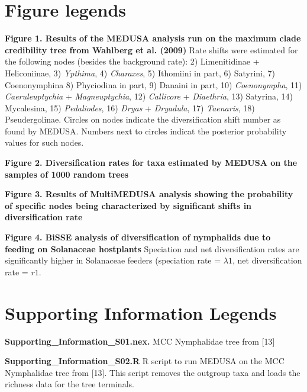 \documentclass[10pt]{article}
\begin{document}
\section*{Figure legends}
\begin{description}
 \item {\bf Figure 1. Results of the MEDUSA analysis run on the maximum
clade credibility tree from Wahlberg et al. (2009)} Rate shifts were estimated for the
following nodes (besides the background rate): 2) Limenitidinae +
Heliconiinae, 3) \emph{Ypthima}, 4) \emph{Charaxes}, 5) Ithomiini in
part, 6) Satyrini, 7) Coenonymphina 8) Phyciodina in part, 9) Danaini in
part, 10) \emph{Coenonympha}, 11) \emph{Caeruleuptychia} +
\emph{Magneuptychia}, 12) \emph{Callicore} + \emph{Diaethria}, 13)
Satyrina, 14) Mycalesina, 15) \emph{Pedaliodes}, 16) \emph{Dryas} +
\emph{Dryadula}, 17) \emph{Taenaris}, 18) Pseudergolinae. Circles on
nodes indicate the diversification shift number as found by MEDUSA.
Numbers next to circles indicat the posterior probability values for
such nodes.

\item {\bf Figure 2. Diversification rates for taxa estimated by MEDUSA on
the samples of 1000 random trees}

\item {\bf Figure 3. Results of MultiMEDUSA analysis showing the
probability of specific nodes being characterized by significant shifts
in diversification rate}

\item {\bf Figure 4. BiSSE analysis of diversification of nymphalids due
to feeding on Solanaceae hostplants} Speciation and net diversification
rates are significantly higher in Solanaceae feeders (speciation rate =
$\lambda1$, net diversification rate = $r1$.
\end{description}


\section*{Supporting Information Legends}
\begin{description}
 \item {\bf Supporting\_Information\_S01.nex.} MCC Nymphalidae tree from
{[}13{]}
\item {\bf Supporting\_Information\_S02.R} R script to run MEDUSA on the
MCC Nymphalidae tree from {[}13{]}. This script removes the outgroup
taxa and loads the richness data for the tree terminals.
\end{description}
\end{document}
